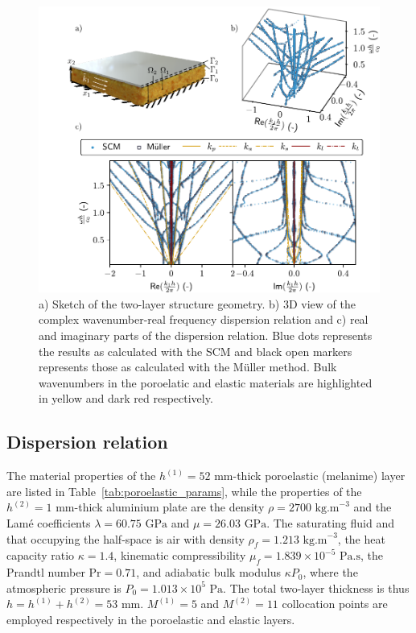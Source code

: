     \begin{figure}
        \centering
        \includegraphics{chapitres/article_JAP/figures/bicouche.pdf}
        \caption{ a) Sketch of the two-layer structure geometry. b) 3D view of the complex wavenumber-real frequency dispersion relation and c) real and imaginary parts of the dispersion relation. Blue dots represents the results as calculated with the SCM and black open markers represents those as calculated with the Müller method. Bulk wavenumbers in the poroelatic and elastic materials are highlighted in yellow and dark red respectively.}
        \label{fig:bilayer}
    \end{figure}
    
    \subsection{Dispersion relation}\label{Disrel}
The material properties of the $h^{(1)}= 52\textrm{ mm}$-thick poroelastic (melanime) layer are listed in Table~\ref{tab:poroelastic_params}, while the properties of the $h^{(2)}=1\textrm{ mm}$-thick aluminium plate are the density $\rho = 2700 \textrm{ kg.m}^{-3}$ and the Lamé coefficients $\lambda = 60.75 \textrm{ GPa}$ and $\mu =  26.03 \textrm{ GPa}$. The saturating fluid and that occupying the half-space is air with density $\rho_f = 1.213\textrm{ kg.m}^{-3}$, the heat capacity ratio $\kappa = 1.4$, kinematic compressibility $\mu_f = 1.839 \times 10^{-5} \textrm{ Pa.s}$, the Prandtl number $\textrm{Pr} = 0.71$, and adiabatic bulk modulus $\kappa P_0$, where the atmospheric pressure is $P_0 = 1.013 \times 10^5 \textrm{ Pa}$. The total two-layer thickness is thus $h=h^{(1)}+h^{(2)}=53\textrm{ mm}$. $M^{(1)}=5$ and $M^{(2)}=11$ collocation points are employed respectively in the poroelastic and elastic layers.
    
